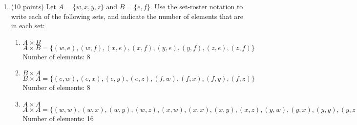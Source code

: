 \documentclass{article}
\begin{document}
\begin{enumerate}
\begin{enumerate}
        \item Is $\{1\} \subseteq \{1, \{2\}\}$?\\
        \vspace{1em}
        No.
        \vspace{1em}
        
        \hrulefill

        \item Is $\{1\} \subseteq \{1\}$?\\
        \vspace{1em}
        Yes.
        \vspace{1em}
    \end{enumerate}
    
    \hrulefill

    \item (10 points) Let $A = \{w, x, y, z\}$ and $B = \{e, f\}$. Use the set-roster notation to write each of the following sets, and indicate the number of elements that are in each set:
    \begin{enumerate}
        \item $A \times B$\\
        \vspace{1em}
        $A \times B = \{(w, e), (w, f), (x, e), (x, f), (y, e), (y, f), (z, e), (z, f)\}$\\
        Number of elements: 8
        \vspace{1em}
        
        \hrulefill

        \item $B \times A$\\
        \vspace{1em}
        $B \times A = \{(e, w), (e, x), (e, y), (e, z), (f, w), (f, x), (f, y), (f, z)\}$\\
        Number of elements: 8
        \vspace{1em}
        
        \hrulefill

        \item $A \times A$\\
        \vspace{1em}
        $A \times A = \{(w, w), (w, x), (w, y), (w, z), (x, w), (x, x), (x, y), (x, z), (y, w), (y, x), (y, y), (y, z), (z, w), (z, x), (z, y), (z, z)\}$\\
        Number of elements: 16
        \vspace{1em}
        
        \hrulefill


\end{enumerate}
\end{enumerate}
\end{document}
